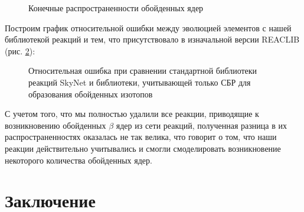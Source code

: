 \documentclass[%
master,    %
natbib,      %
subf,        %
href,        %
colorlinks,  %
]{disser}
\begin{document}
\begin{figure}
	\caption{Конечные распространенности обойденных ядер}
	\label{ris:result}
\end{figure}

Построим график относительной ошибки между эволюцией элементов с нашей библиотекой реакций и тем, что присутствовало в изначальной версии REACLIB (рис. \ref{ris:result-err}):

\begin{figure}
	\caption{Относительная ошибка при сравнении стандартной библиотеки реакций SkyNet и библиотеки, учитывающей только СБР для образования обойденных изотопов}
	\label{ris:result-err}
\end{figure}

С учетом того, что мы полностью удалили все реакции, приводящие к возникновению обойденных $\beta$ ядер из сети реакций, полученная разница в их распространенностях оказалась не так велика, что говорит о том, что наши реакции действительно учитывались и смогли смоделировать возникновение некоторого количества обойденных ядер.

\section{Заключение}
\end{document}
